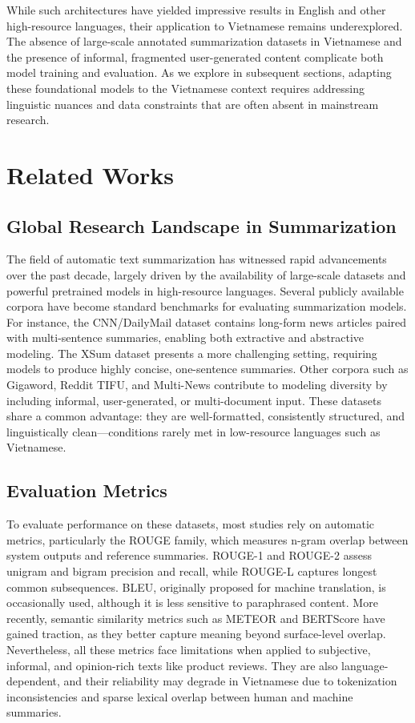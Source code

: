 \documentclass{article}
\begin{document}
While such architectures have yielded impressive results in English and other high-resource languages, their application to Vietnamese remains underexplored. The absence of large-scale annotated summarization datasets in Vietnamese and the presence of informal, fragmented user-generated content complicate both model training and evaluation. As we explore in subsequent sections, adapting these foundational models to the Vietnamese context requires addressing linguistic nuances and data constraints that are often absent in mainstream research.

\vspace{1em}
\section{Related Works}

\subsection{Global Research Landscape in Summarization}

The field of automatic text summarization has witnessed rapid advancements over the past decade, largely driven by the availability of large-scale datasets and powerful pretrained models in high-resource languages. Several publicly available corpora have become standard benchmarks for evaluating summarization models. For instance, the CNN/DailyMail dataset contains long-form news articles paired with multi-sentence summaries, enabling both extractive and abstractive modeling. The XSum dataset presents a more challenging setting, requiring models to produce highly concise, one-sentence summaries. Other corpora such as Gigaword, Reddit TIFU, and Multi-News contribute to modeling diversity by including informal, user-generated, or multi-document input. These datasets share a common advantage: they are well-formatted, consistently structured, and linguistically clean—conditions rarely met in low-resource languages such as Vietnamese.

\subsection{Evaluation Metrics}

To evaluate performance on these datasets, most studies rely on automatic metrics, particularly the ROUGE family, which measures n-gram overlap between system outputs and reference summaries. ROUGE-1 and ROUGE-2 assess unigram and bigram precision and recall, while ROUGE-L captures longest common subsequences. BLEU, originally proposed for machine translation, is occasionally used, although it is less sensitive to paraphrased content. More recently, semantic similarity metrics such as METEOR and BERTScore have gained traction, as they better capture meaning beyond surface-level overlap. Nevertheless, all these metrics face limitations when applied to subjective, informal, and opinion-rich texts like product reviews. They are also language-dependent, and their reliability may degrade in Vietnamese due to tokenization inconsistencies and sparse lexical overlap between human and machine summaries.
\end{document}
